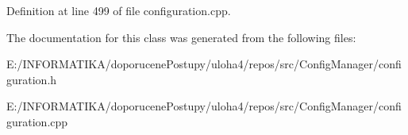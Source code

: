Definition at line 499 of file configuration.\+cpp.



The documentation for this class was generated from the following files\+:\begin{DoxyCompactItemize}
\item 
E\+:/\+I\+N\+F\+O\+R\+M\+A\+T\+I\+K\+A/doporucene\+Postupy/uloha4/repos/src/\+Config\+Manager/configuration.\+h\item 
E\+:/\+I\+N\+F\+O\+R\+M\+A\+T\+I\+K\+A/doporucene\+Postupy/uloha4/repos/src/\+Config\+Manager/configuration.\+cpp\end{DoxyCompactItemize}
